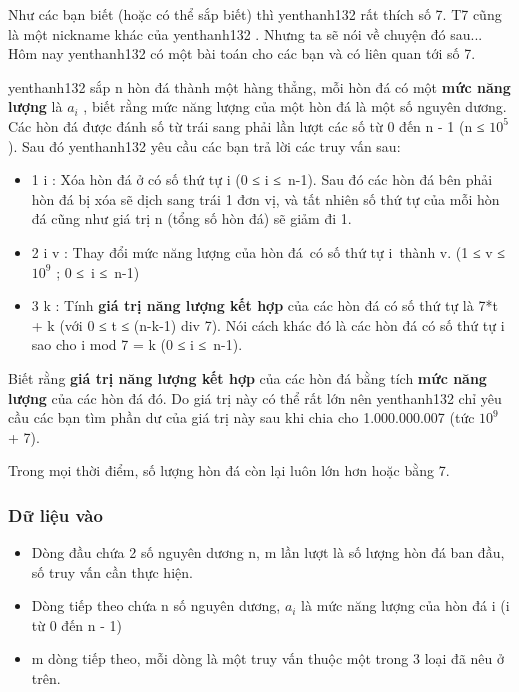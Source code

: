 



   Như các bạn biết (hoặc có thể sắp biết) thì   yenthanh132   rất thích số 7.   T7   cũng là một nickname khác của   yenthanh132   . Nhưng ta sẽ nói về chuyện đó sau... Hôm nay   yenthanh132   có một bài toán cho các bạn và có liên quan tới số 7.  

yenthanh132   sắp n hòn đá thành một hàng thẳng, mỗi hòn đá có một   \textbf{    mức năng lượng   }   là $a_{i}$   , biết rằng mức năng lượng của một hòn đá là một số nguyên dương. Các hòn đá được đánh số từ trái sang phải lần lượt các số từ 0 đến n - 1 (n ≤ $10^{5}$   ). Sau đó   yenthanh132   yêu cầu các bạn trả lời các truy vấn sau:  
\begin{itemize}
	\item     1 i : Xóa hòn đá ở có số thứ tự i (0 ≤ i ≤ n-1). Sau đó các hòn đá bên phải hòn đá bị xóa sẽ dịch sang trái 1 đơn vị, và tất nhiên số thứ tự của mỗi hòn đá cũng như giá trị n (tổng số hòn đá) sẽ giảm đi 1.   
	\item     2 i v : Thay đổi mức năng lượng của hòn đá có số thứ tự i thành v. (1 ≤ v ≤ $10^{9}$    ; 0 ≤ i ≤ n-1)   
	\item     3 k : Tính    \textbf{     giá trị năng lượng kết hợp    }    của các hòn đá có số thứ tự là 7*t + k (với 0 ≤ t ≤ (n-k-1) div 7). Nói cách khác đó là các hòn đá có số thứ tự i sao cho i mod 7 = k (0 ≤ i ≤ n-1).   
\end{itemize}

   Biết rằng   \textbf{    giá trị năng lượng kết hợp   }   của các hòn đá bằng tích   \textbf{    mức năng lượng   }   của các hòn đá đó. Do giá trị này có thể rất lớn nên   yenthanh132   chỉ yêu cầu các bạn tìm phần dư của giá trị này sau khi chia cho 1.000.000.007 (tức $10^{9}$   + 7).  

   Trong mọi thời điểm, số lượng hòn đá còn lại luôn lớn hơn hoặc bằng 7.  

\subsubsection{   Dữ liệu vào  }
\begin{itemize}
	\item     Dòng đầu chứa 2 số nguyên dương n, m lần lượt là số lượng hòn đá ban đầu, số truy vấn cần thực hiện.   
	\item     Dòng tiếp theo chứa n số nguyên dương, $a_{i}$    là mức năng lượng của hòn đá i (i từ 0 đến n - 1)   
	\item     m dòng tiếp theo, mỗi dòng là một truy vấn thuộc một trong 3 loại đã nêu ở trên.   
\end{itemize}

